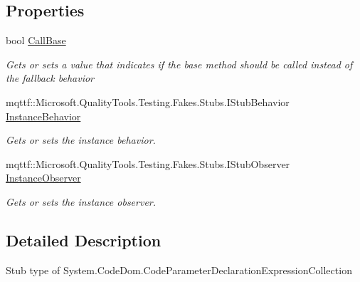 \subsection*{Properties}
\begin{DoxyCompactItemize}
\item 
bool \hyperlink{class_system_1_1_code_dom_1_1_fakes_1_1_stub_code_parameter_declaration_expression_collection_a6cb2ef91d590a4c6093cd21e4161a4ae}{Call\-Base}
\begin{DoxyCompactList}\small\item\em Gets or sets a value that indicates if the base method should be called instead of the fallback behavior\end{DoxyCompactList}\item 
mqttf\-::\-Microsoft.\-Quality\-Tools.\-Testing.\-Fakes.\-Stubs.\-I\-Stub\-Behavior \hyperlink{class_system_1_1_code_dom_1_1_fakes_1_1_stub_code_parameter_declaration_expression_collection_ac08a4921ea4f93bba576f4ff62b75c91}{Instance\-Behavior}
\begin{DoxyCompactList}\small\item\em Gets or sets the instance behavior.\end{DoxyCompactList}\item 
mqttf\-::\-Microsoft.\-Quality\-Tools.\-Testing.\-Fakes.\-Stubs.\-I\-Stub\-Observer \hyperlink{class_system_1_1_code_dom_1_1_fakes_1_1_stub_code_parameter_declaration_expression_collection_aaff4c57e70ba13cfd21d745f06fd22dc}{Instance\-Observer}
\begin{DoxyCompactList}\small\item\em Gets or sets the instance observer.\end{DoxyCompactList}\end{DoxyCompactItemize}


\subsection{Detailed Description}
Stub type of System.\-Code\-Dom.\-Code\-Parameter\-Declaration\-Expression\-Collection



